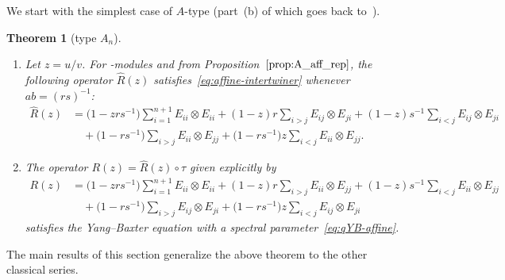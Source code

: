 \documentclass[10pt,a4paper]{amsart}
\numberwithin{equation}{section}
\newtheorem{Theorem}{Theorem}[section]
\newcommand{\ssl}{\mathfrak{sl}}
\begin{document}
We start with the simplest case of $A$-type (part~(b) of which goes back to~\cite[Section~2]{JL2}).

\begin{Theorem}[type $A_{n}$]\label{thm:A_AffRMatrix}\quad
\begin{enumerate}
\item[$(a)$] Let $z=u/v$. For \smash{$U_{r,s}\bigl(\widehat{\ssl}_{n+1}\bigr)$}-modules  and  from Proposition~$\ref{prop:A_aff_rep}$, the following operator $\hat{R}(z)$ satisfies~\eqref{eq:affine-intertwiner} whenever $ab = (rs)^{-1}$:
\begin{align}
 \hat{R}(z) &=
 \bigl(1 -zrs^{-1}\bigr)\sum_{i = 1}^{n + 1} E_{ii} \otimes E_{ii} + (1 - z)r\sum_{i > j} E_{ij} \otimes E_{ji} +
 (1 - z)s^{-1}\sum_{i < j}E_{ij} \otimes E_{ji} \nonumber\\
 & \quad + \bigl(1 - rs^{-1}\bigr)\sum_{i > j}E_{ii} \otimes E_{jj} +
 \bigl(1 - rs^{-1}\bigr)z\sum_{i < j}E_{ii} \otimes E_{jj}.\label{eq:A_AffRMatrix}
\end{align}


\item[$(b)$] The operator $R(z)=\hat{R}(z)\circ \tau$ given explicitly by
\begin{displaymath}
\begin{split}
 R(z) &=
 \bigl(1 -zrs^{-1}\bigr)\sum_{i = 1}^{n + 1} E_{ii} \otimes E_{ii} + (1 - z)r\sum_{i > j} E_{ii} \otimes E_{jj} +
 (1 - z)s^{-1}\sum_{i < j} E_{ii} \otimes E_{jj} \\
 & \quad + \bigl(1 - rs^{-1}\bigr)\sum_{i > j} E_{ij} \otimes E_{ji} +
 \bigl(1 - rs^{-1}\bigr)z\sum_{i < j} E_{ij} \otimes E_{ji}
\end{split}
\end{displaymath}
satisfies the Yang--Baxter equation with a spectral parameter~\eqref{eq:qYB-affine}.
\end{enumerate}
\end{Theorem}

The main results of this section generalize the above theorem to the other classical series.
\end{document}
